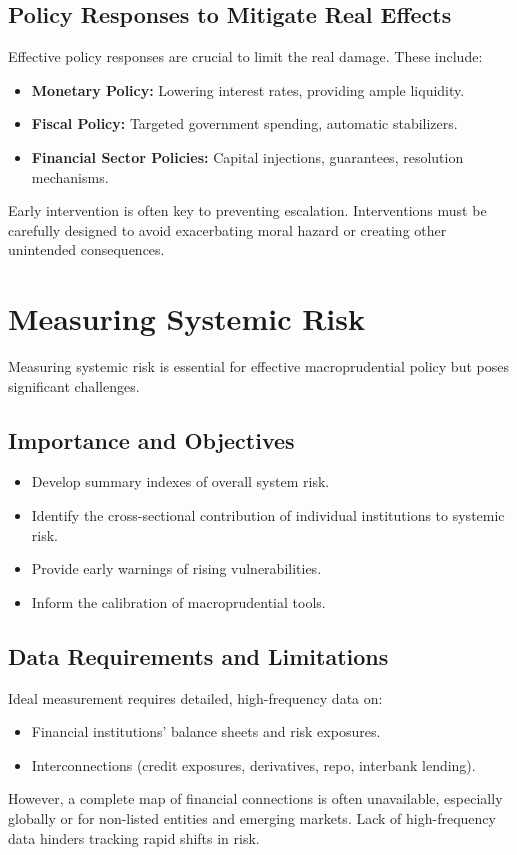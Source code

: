 \subsection{Policy Responses to Mitigate Real Effects}
Effective policy responses are crucial to limit the real damage. These include:
\begin{itemize}
    \item \textbf{Monetary Policy:} Lowering interest rates, providing ample liquidity.
    \item \textbf{Fiscal Policy:} Targeted government spending, automatic stabilizers.
    \item \textbf{Financial Sector Policies:} Capital injections, guarantees, resolution mechanisms.
\end{itemize}
Early intervention is often key to preventing escalation. Interventions must be carefully designed to avoid exacerbating moral hazard or creating other unintended consequences.

\section{Measuring Systemic Risk}

Measuring systemic risk is essential for effective macroprudential policy but poses significant challenges.

\subsection{Importance and Objectives}
\begin{itemize}
    \item Develop summary indexes of overall system risk.
    \item Identify the cross-sectional contribution of individual institutions to systemic risk.
    \item Provide early warnings of rising vulnerabilities.
    \item Inform the calibration of macroprudential tools.
\end{itemize}

\subsection{Data Requirements and Limitations}
Ideal measurement requires detailed, high-frequency data on:
\begin{itemize}
    \item Financial institutions' balance sheets and risk exposures.
    \item Interconnections (credit exposures, derivatives, repo, interbank lending).
\end{itemize}
However, a complete map of financial connections is often unavailable, especially globally or for non-listed entities and emerging markets. Lack of high-frequency data hinders tracking rapid shifts in risk.

